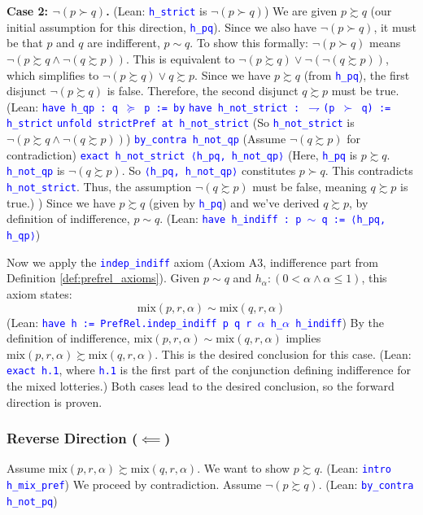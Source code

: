 \documentclass{article}
\theoremstyle{definition}
\newcommand{\tactic}[1]{\textcolor{blue}{\texttt{#1}}}
\newcommand{\pref}{\succsim} %
\newcommand{\strictpref}{\succ} %
\newcommand{\indiff}{\sim} %
\newcommand{\mix}{\mathrm{mix}} %
\begin{document}
\textbf{Case 2: $\lnot(p \strictpref q)$.}
(Lean: \tactic{h\_strict} is $\neg(p \succ q)$)
We are given $p \pref q$ (our initial assumption for this direction, \tactic{h\_pq}).
Since we also have $\lnot(p \strictpref q)$, it must be that $p$ and $q$ are indifferent, $p \indiff q$.
To show this formally:
$\lnot(p \strictpref q)$ means $\lnot(p \pref q \land \lnot(q \pref p))$.
This is equivalent to $\lnot(p \pref q) \lor \lnot(\lnot(q \pref p))$, which simplifies to $\lnot(p \pref q) \lor q \pref p$.
Since we have $p \pref q$ (from \tactic{h\_pq}), the first disjunct $\lnot(p \pref q)$ is false.
Therefore, the second disjunct $q \pref p$ must be true.
(Lean:
\tactic{have h\_qp : q $\succeq$ p := by}
  \tactic{have h\_not\_strict : $\rightharpoondown$(p $\succ$ q) := h\_strict}
  \tactic{unfold strictPref at h\_not\_strict} (So \tactic{h\_not\_strict} is $\neg(p \pref q \land \neg(q \pref p))$)
  \tactic{by\_contra h\_not\_qp} (Assume $\neg(q \pref p)$ for contradiction)
  \tactic{exact h\_not\_strict ⟨h\_pq, h\_not\_qp⟩}
  (Here, \tactic{h\_pq} is $p \pref q$. \tactic{h\_not\_qp} is $\neg(q \pref p)$. So \tactic{⟨h\_pq, h\_not\_qp⟩} constitutes $p \strictpref q$. This contradicts \tactic{h\_not\_strict}. Thus, the assumption $\neg(q \pref p)$ must be false, meaning $q \pref p$ is true.)
)
Since we have $p \pref q$ (given by \tactic{h\_pq}) and we've derived $q \pref p$, by definition of indifference, $p \indiff q$.
(Lean: \tactic{have h\_indiff : p $\sim$ q := ⟨h\_pq, h\_qp⟩})

Now we apply the \tactic{indep\_indiff} axiom (Axiom A3, indifference part from Definition \ref{def:prefrel_axioms}).
Given $p \indiff q$ and $h_\alpha:(0 < \alpha \land \alpha \le 1)$, this axiom states:
\[ \mix(p, r, \alpha) \indiff \mix(q, r, \alpha) \]
(Lean: \tactic{have h := PrefRel.indep\_indiff p q r $\alpha$ h\_$\alpha$ h\_indiff})
By the definition of indifference, $\mix(p, r, \alpha) \indiff \mix(q, r, \alpha)$ implies $\mix(p, r, \alpha) \pref \mix(q, r, \alpha)$.
This is the desired conclusion for this case.
(Lean: \tactic{exact h.1}, where \tactic{h.1} is the first part of the conjunction defining indifference for the mixed lotteries.)
Both cases lead to the desired conclusion, so the forward direction is proven.

\subsubsection{Reverse Direction ($\impliedby$)}
Assume $\mix(p, r, \alpha) \pref \mix(q, r, \alpha)$. We want to show $p \pref q$.
(Lean: \tactic{intro h\_mix\_pref})
We proceed by contradiction. Assume $\lnot(p \pref q)$.
(Lean: \tactic{by\_contra h\_not\_pq})
\end{document}
